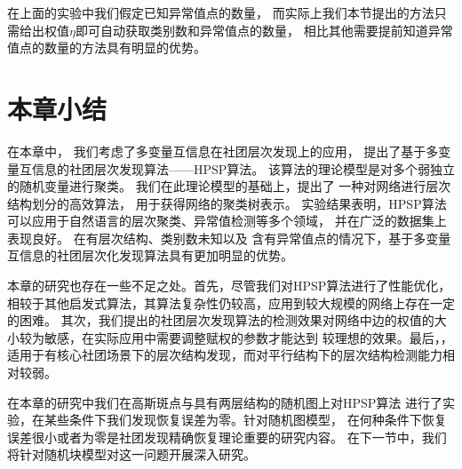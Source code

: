 在上面的实验中我们假定已知异常值点的数量，
而实际上我们本节提出的方法只需给出权值$\eta$即可自动获取类别数和异常值点的数量，
相比其他需要提前知道异常值点的数量的方法具有明显的优势。



\section{本章小结}\label{sec:hierarchical_summary}
在本章中，
我们考虑了多变量互信息在社团层次发现上的应用，
提出了基于多变量互信息的社团层次发现算法——HPSP算法。
该算法的理论模型是对多个弱独立的随机变量进行聚类。
我们在此理论模型的基础上，提出了
一种对网络进行层次结构划分的高效算法，
用于获得网络的聚类树表示。
实验结果表明，HPSP算法可以应用于自然语言的层次聚类、异常值检测等多个领域，
并在广泛的数据集上表现良好。
在有层次结构、类别数未知以及
含有异常值点的情况下，基于多变量互信息的社团层次化发现算法具有更加明显的优势。


本章的研究也存在一些不足之处。首先，尽管我们对HPSP算法进行了性能优化，
相较于其他启发式算法，其算法复杂性仍较高，应用到较大规模的网络上存在一定的困难。
其次，我们提出的社团层次发现算法的检测效果对网络中边的权值的大小较为敏感，在实际应用中需要调整赋权的参数才能达到
较理想的效果。最后，，
适用于有核心社团\cite{wang2011detecting}场景下的层次结构发现，而对平行结构下的层次结构检测能力相对较弱。

在本章的研究中我们在高斯斑点与具有两层结构的随机图上对HPSP算法
进行了实验，在某些条件下我们发现恢复误差为零。针对随机图模型，
在何种条件下恢复误差很小或者为零是社团发现精确恢复理论重要的研究内容。
在下一节中，我们将针对随机块模型对这一问题开展深入研究。
